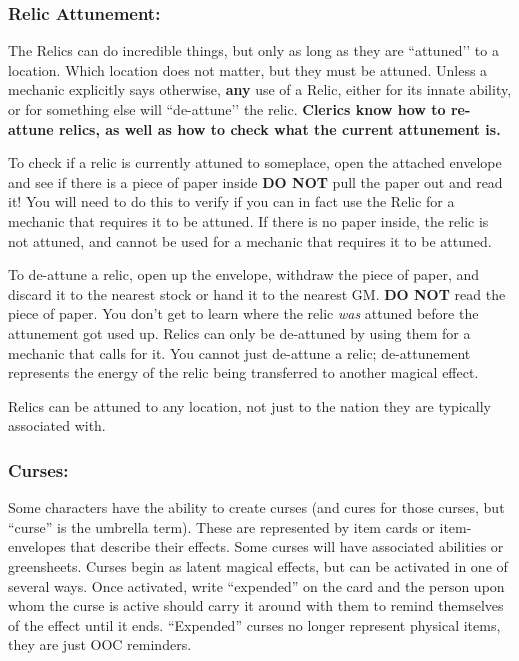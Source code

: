 \documentclass[sheet]{GL2020}
\begin{document}
{{\subsubsection{Relic Attunement:}
The Relics can do incredible things, but only as long as they are ``attuned’’ to a location. Which location does not matter, but they must be attuned. Unless a mechanic explicitly says otherwise, \textbf{any} use of a Relic, either for its innate ability, or for something else will ``de-attune’’ the relic. \textbf{Clerics know how to re-attune relics, as well as how to check what the current attunement is.}

To check if a relic is currently attuned to someplace, open the attached envelope and see if there is a piece of paper inside \textbf{DO NOT} pull the paper out and read it! You will need to do this to verify if you can in fact use the Relic for a mechanic that requires it to be attuned. If there is no paper inside, the relic is not attuned, and cannot be used for a mechanic that requires it to be attuned.

To de-attune a relic, open up the envelope, withdraw the piece of paper, and discard it to the nearest stock or hand it to the nearest GM. \textbf{DO NOT} read the piece of paper. You don’t get to learn where the relic \emph{was} attuned before the attunement got used up. Relics can only be de-attuned by using them for a mechanic that calls for it. You cannot just de-attune a relic; de-attunement represents the energy of the relic being transferred to another magical effect.

Relics can be attuned to any location, not just to the nation they are typically associated with.

\subsubsection{Curses:}
Some characters have the ability to create curses (and cures for those curses, but ``curse'' is the umbrella term). These are represented by item cards or item-envelopes that describe their effects. Some curses will have associated abilities or greensheets. Curses begin as latent magical effects, but can be activated in one of several ways. Once activated, write ``expended'' on the card and the person upon whom the curse is active should carry it around with them to remind themselves of the effect until it ends. ``Expended'' curses no longer represent physical items, they are just OOC reminders.

}}
\end{document}
